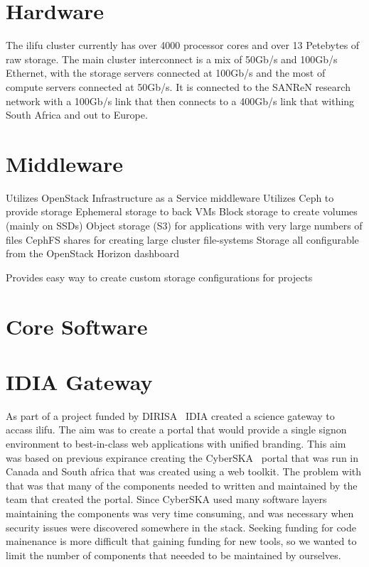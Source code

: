 \documentclass[12pt,twocolumn,a4paper]{article}
\begin{document}


\section{Hardware}
\label{sec:hardware}



The ilifu cluster currently has over 4000 processor cores and over 13 Petebytes of raw storage. The main
 cluster interconnect is a mix of 50Gb/s and 100Gb/s Ethernet, with the storage servers connected at 100Gb/s and the 
most of compute servers connected at 50Gb/s. It is connected to the SANReN research network with a 100Gb/s link
that then connects to a 400Gb/s link that withing South Africa and out to Europe.


\section{Middleware}
\label{sec:middleware}

Utilizes OpenStack Infrastructure as a Service middleware
Utilizes Ceph to provide storage
Ephemeral storage to back VMs
Block storage to create volumes (mainly on SSDs) Object storage (S3) for applications with very large numbers of files
CephFS shares for creating large cluster file-systems Storage all configurable from the OpenStack Horizon dashboard

Provides easy way to create custom storage configurations for projects

\section{Core Software}
\label{sec:core_software}


\section{IDIA Gateway}
\label{sec:gateway}

As part of a project funded by DIRISA~\cite{DIRISA2015} IDIA created a science gateway to accass ilifu. The aim was to create
a portal that would provide a single signon environment to best-in-class web applications with unified branding. 
This aim was based on 
previous expirance creating the CyberSKA~\cite{cyberska} portal that was run in Canada and South africa that
was created using a web toolkit. The problem with that was that many of the components needed to written and maintained
by the team that created the portal. Since CyberSKA used many software 
layers maintaining the components was very time consuming, and was necessary when security issues were discovered
somewhere in the stack.
Seeking funding for code mainenance is more difficult that gaining funding for new tools, so we wanted to limit the number of
components that neeeded to be maintained by ourselves.
\end{document}
